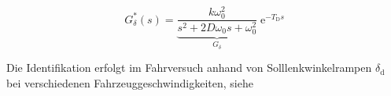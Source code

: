 \begin{equation}
G_\delta^*(s)=\underbrace{\frac{k\omega_0^2}{s^2+2D\omega_0 s + \omega_0^2}}_{\displaystyle{G_\delta}}\;\mathrm{e}^{-T_\mathrm{D}s}\label{eq:GL2}
\end{equation}


Die Identifikation erfolgt im Fahrversuch anhand von Solllenkwinkelrampen $\delta_\mathrm{d}$ bei verschiedenen Fahrzeuggeschwindigkeiten, siehe 

\begin{figure}[htp!]
\begin{minipage}[t]{0.5\textwidth}
\centering
{}
\parbox{0.9\textwidth}{\label{fig:EpsIdent}}
\end{minipage}
\begin{minipage}[t]{0.5\textwidth}
\centering
\setlength\figureheight{2.5cm} 
\setlength\figurewidth{5cm}
\scalebox{0.9}{}
\parbox{0.8\textwidth}{\label{fig:ident_zff}}
\end{minipage}
\end{figure}

%	   


